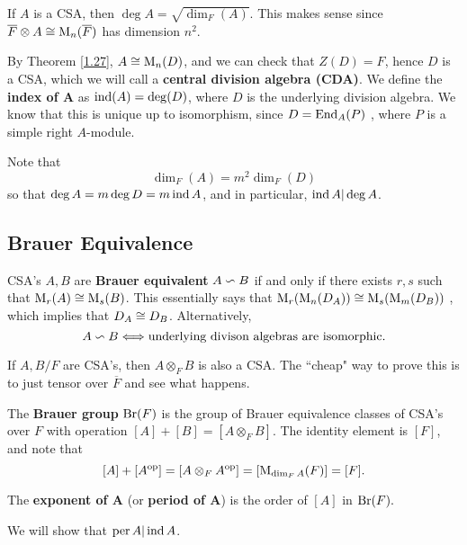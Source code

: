 \begin{defn}\label{2.12}
If $A$ is a CSA, then $\deg A = \sqrt{\dim_F(A)}$. This makes sense since $\overline{F} \otimes A \cong \operatorname{M}_n(\overline{F})$ has dimension $n^2$. 
\end{defn}
\begin{defn}\label{2.13}
By Theorem \ref{1.27}, $A \cong \operatorname{M}_n(D)$, and we can check that $Z(D) = F$, hence $D$ is a CSA, which we will call a \textbf{central division algebra (CDA)}. We define the \textbf{index of A} as $\operatorname{ind} (A) = \deg (D)$, where $D$ is the underlying division algebra. We know that this is unique up to isomorphism, since $D = \operatorname{End}_A(P)$ , where $P$ is a simple right $A$-module.
\end{defn}
\begin{remark}\label{2.14}
Note that 
$$\dim_F(A) = m^2 \dim_F (D)$$
so that $\deg A = m \deg D = m \operatorname{ind} A$, and in particular, $\operatorname{ind} A | \deg A$.
\end{remark}
\subsection{Brauer Equivalence}
\begin{defn}\label{2.16}
CSA's $A,B$ are \textbf{Brauer equivalent} $A \backsim B$ if and only if there exists $r,s$ such that $\operatorname{M}_r(A) \cong \operatorname{M}_s(B)$. This essentially says that $\operatorname{M}_r(\operatorname{M}_n(D_A)) \cong \operatorname{M}_s(\operatorname{M}_m(D_B))$ , which implies that $D_A \cong D_B$. Alternatively, 
$$A \backsim B \Longleftrightarrow \text{underlying divison algebras are isomorphic.}$$
\end{defn}

\begin{fact}
If $A,B/F$ are CSA's, then $A \otimes_F B$ is also a CSA. The ``cheap" way to prove this is to just tensor over $\overline{F}$ and see what happens.
\end{fact}
\begin{defn}\label{2.17}
The \textbf{Brauer group} $\operatorname{Br} (F)$ is the group of Brauer equivalence classes of CSA's over $F$ with operation $[A] + [B] = [A\otimes_F B].$ The identity element is $[F]$, and note that 
$$[A] + [A^{\operatorname{op}}] = [A \otimes_F A^{\operatorname{op}}] = [\operatorname{M}_{\dim_FA}(F)] = [F].$$
\end{defn}

\begin{defn}\label{2.18}
The \textbf{exponent of A} (or \textbf{period of A}) is the order of $[A]$ in $\operatorname{Br} (F).$
\end{defn}

\begin{fact}
We will show that $\operatorname{per} A | \operatorname{ind} A$.
\end{fact}

